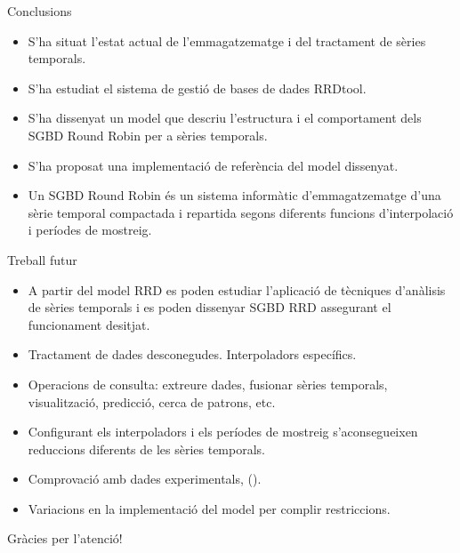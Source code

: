 \begin{frame}{Conclusions}

  \begin{itemize}
  \item S'ha situat l'estat actual de l'emmagatzematge i del tractament de sèries temporals.

  \item S'ha estudiat el sistema de gestió de bases de dades RRDtool.

  \item S'ha dissenyat un model que descriu l'estructura i el
    comportament dels SGBD Round Robin per a sèries temporals.
  
  \item S'ha proposat una implementació de referència del model dissenyat.


 \item Un SGBD Round Robin és un sistema informàtic d'emmagatzematge d'una sèrie temporal compactada i repartida segons diferents funcions d'interpolació i períodes de mostreig.

  \end{itemize}

\end{frame}




\begin{frame}{Treball futur}

\begin{itemize}

\item A partir del model RRD es poden estudiar l'aplicació de tècniques d'anàlisis de sèries temporals  i es poden dissenyar SGBD RRD assegurant el funcionament desitjat.


\item Tractament de dades desconegudes. Interpoladors específics.

\item Operacions de consulta: extreure dades, fusionar sèries temporals, visualització, predicció, cerca de patrons, etc.

\item Configurant els interpoladors i els períodes de mostreig s'aconsegueixen reduccions diferents de les sèries temporals.

\item Comprovació amb dades experimentals, (\cite{keogh02}).

\item Variacions en la implementació del model per complir restriccions.

\end{itemize}
\end{frame}


\begin{frame}

\begin{center}
{\huge
Gràcies per l'atenció!
}
\end{center}

\end{frame}

